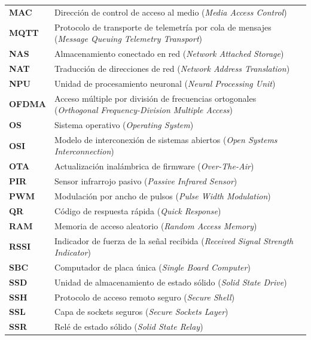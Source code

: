 \documentclass[a4paper, 12pt]{article}
\begin{document}
\newpage

\noindent
\renewcommand{\arraystretch}{1.2}
\begin{tabularx}{\textwidth}{@{}p{1.8cm} X@{}}
    \textbf{MAC} & Dirección de control de acceso al medio (\textit{Media Access Control}) \\
    \textbf{MQTT} & Protocolo de transporte de telemetría por cola de mensajes (\textit{Message Queuing Telemetry Transport}) \\
    \textbf{NAS} & Almacenamiento conectado en red (\textit{Network Attached Storage}) \\
    \textbf{NAT} & Traducción de direcciones de red (\textit{Network Address Translation}) \\
    \textbf{NPU} & Unidad de procesamiento neuronal (\textit{Neural Processing Unit}) \\
    \textbf{OFDMA} & Acceso múltiple por división de frecuencias ortogonales (\textit{Orthogonal Frequency-Division Multiple Access}) \\
    \textbf{OS} & Sistema operativo (\textit{Operating System}) \\
    \textbf{OSI} & Modelo de interconexión de sistemas abiertos (\textit{Open Systems Interconnection}) \\
    \textbf{OTA} & Actualización inalámbrica de firmware (\textit{Over-The-Air}) \\
    \textbf{PIR} & Sensor infrarrojo pasivo (\textit{Passive Infrared Sensor}) \\
    \textbf{PWM} & Modulación por ancho de pulsos (\textit{Pulse Width Modulation}) \\
    \textbf{QR} & Código de respuesta rápida (\textit{Quick Response}) \\
    \textbf{RAM} & Memoria de acceso aleatorio (\textit{Random Access Memory}) \\
    \textbf{RSSI} & Indicador de fuerza de la señal recibida (\textit{Received Signal Strength Indicator}) \\
    \textbf{SBC} & Computador de placa única (\textit{Single Board Computer}) \\
    \textbf{SSD} & Unidad de almacenamiento de estado sólido (\textit{Solid State Drive}) \\
    \textbf{SSH} & Protocolo de acceso remoto seguro (\textit{Secure Shell}) \\
    \textbf{SSL} & Capa de sockets seguros (\textit{Secure Sockets Layer}) \\
    \textbf{SSR} & Relé de estado sólido (\textit{Solid State Relay}) \\

\end{tabularx}
\end{document}
